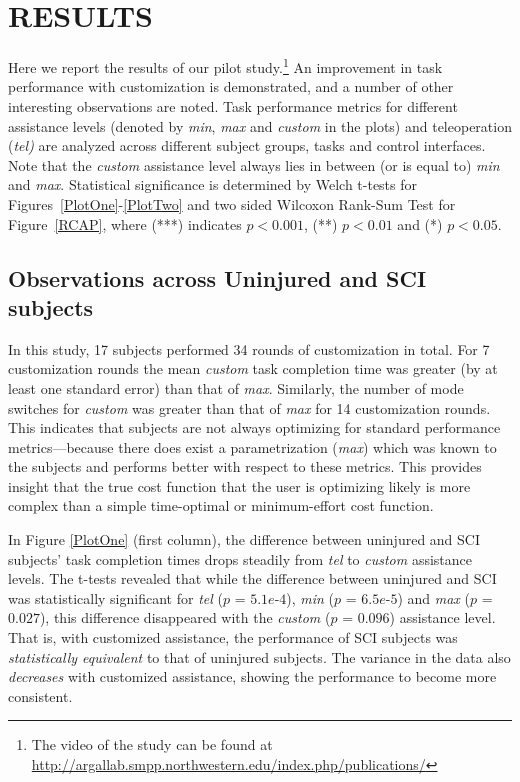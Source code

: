 \documentclass[letterpaper, 10 pt, journal, twoside]{IEEEtran}  %
\begin{document}
	\section{RESULTS} \label{RES}
	Here we report the results of our pilot study.\footnote{The video of the study can be found at \url{http://argallab.smpp.northwestern.edu/index.php/publications/}} An improvement in task performance with customization is demonstrated, and a number of other interesting observations are noted. Task performance metrics for different assistance levels (denoted by \textit{min}, \textit{max} and \textit{custom} in the plots) and teleoperation (\textit{tel)} are analyzed across different subject groups, tasks and control interfaces. Note that the \textit{custom} assistance level always lies in between (or is equal to) \textit{min} and \textit{max}. 
	Statistical significance is determined by Welch t-tests for Figures~\ref{PlotOne}-\ref{PlotTwo} and two sided Wilcoxon Rank-Sum Test for Figure~\ref{RCAP}, where (***) indicates $p<0.001$, (**) $p<0.01$ and (*) $p<0.05$.
	\subsection{Observations across Uninjured and SCI subjects}
	In this study, 17 subjects performed 34 rounds of customization in total. For 7 customization rounds the mean \textit{custom} task completion time was greater (by at least one standard error) than that of \textit{max}. Similarly, the number of mode switches for \textit{custom} was greater than that of \textit{max} for 14 customization rounds. This indicates that subjects are not always optimizing for standard performance metrics---because there does exist a parametrization (\textit{max}) which was known to the subjects and performs better with respect to these metrics.
	This  provides insight that the true cost function that the user is optimizing likely is more complex than a simple time-optimal or minimum-effort cost function. 
	
	\vspace{0.1cm}
	In Figure \ref{PlotOne} (first column), the difference between uninjured and SCI subjects' task completion times drops steadily from \textit{tel} to \textit{custom} assistance levels. The t-tests revealed that while the difference between uninjured and SCI was statistically significant for \textit{tel} ($p$ = $5.1e$-$4$), \textit{min} ($p$ = $6.5e$-$5$) and \textit{max} ($p$ = $0.027$), this difference disappeared with the \textit{custom} ($p$ = $0.096$) assistance level. That is, with customized assistance, the performance of SCI subjects was \textit{statistically equivalent} to that of uninjured subjects. The variance in the data also \textit{decreases} with customized assistance, showing the performance to become more consistent. 
	
\end{document}

